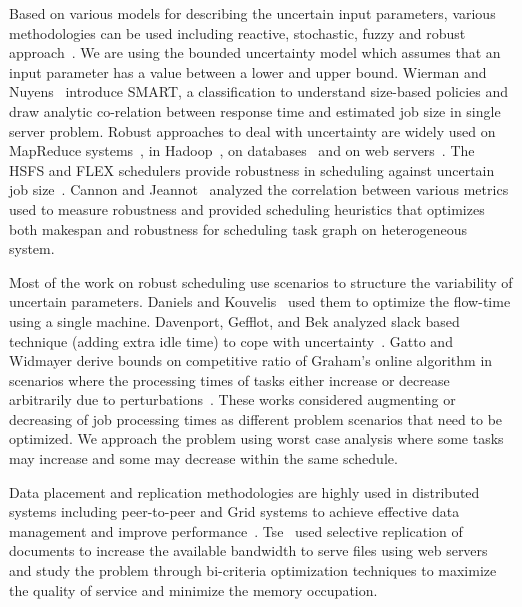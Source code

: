 \documentclass[twocolumn]{svjour3}
\begin{document}
Based on various models for describing the uncertain input parameters,
various methodologies can be used including reactive, stochastic,
fuzzy and robust approach~\cite{DBLP:journals/cce/LiI08}. We are using
the bounded uncertainty model which assumes that an input parameter
has a value between a lower and upper bound.  Wierman and
Nuyens~\cite{conf/sigmetrics/WiermanN08} introduce SMART, a
classification to understand size-based policies and draw analytic
co-relation between response time and estimated job size in single
server problem. Robust approaches to deal with uncertainty are widely
used on MapReduce
systems~\cite{Kavulya:2010:ATP:1844765.1845224,Verma:2011:AAR:1998582.1998637},
in
Hadoop~\cite{Wolf:2010:FSA:2023718.2023720,White:2009:HDG:1717298},
on databases~\cite{Lipton199518} and on web
servers~\cite{Cardellini99dynamicload}. The HSFS and FLEX schedulers
provide robustness in scheduling against uncertain job
size~\cite{Wolf:2010:FSA:2023718.2023720,6691554}. Cannon and
Jeannot~\cite{cj09c} analyzed the correlation between various metrics
used to measure robustness and provided scheduling heuristics that
optimizes both makespan and robustness for scheduling task graph on
heterogeneous system.

Most of the work on robust scheduling use scenarios to structure
the variability of uncertain parameters. Daniels and
Kouvelis~\cite{citeulike:8334169} used them to optimize the flow-time
using a single machine. Davenport, Gefflot, and Bek analyzed slack
based technique (adding extra idle time) to cope with
uncertainty~\cite{Davenport_slack-basedtechniques}. Gatto and Widmayer
derive bounds on competitive ratio of Graham’s online algorithm in
scenarios where the processing times of tasks either increase or decrease
arbitrarily due to perturbations~\cite{Gatto07}.  These works
considered augmenting or decreasing of job processing times as
different problem scenarios that need to be optimized. We 
approach the problem using worst case analysis where some tasks may
increase and some may decrease within the same schedule.
  
Data placement and replication methodologies are highly used in
distributed systems including peer-to-peer and Grid systems to achieve
effective data management and improve
performance~\cite{Cirne2007213,Abawajy,4215379}. Tse~\cite{DBLP:journals/tc/Tse12}
used selective replication of documents to increase the available
bandwidth to serve files using web servers and study the problem
through bi-criteria optimization techniques to maximize the quality of
service and minimize the memory occupation.
\end{document}
